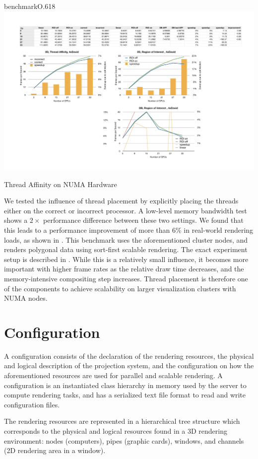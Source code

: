 \begin{wrapfloat}{benchmark}{O}{.618\textwidth}
 \includegraphics[width=.618\textwidth]{results/affinity.pdf}
 {\caption{\label{rNuma}Thread Affinity on NUMA Hardware}}
\end{wrapfloat}

We tested the influence of thread placement by explicitly placing the threads
either on the correct or incorrect processor. A low-level memory bandwidth test
shows a $2\times$ performance difference between these two settings. We found
that this leads to a performance improvement of more than 6\% in real-world
rendering loads, as shown in . This benchmark uses the
aforementioned cluster nodes, and renders polygonal data using sort-first
scalable rendering. The exact experiment setup is described in
\cite{EBAHMP:12}. While this is a relatively small influence, it becomes more
important with higher frame rates as the relative draw time decreases, and the
memory-intensive compositing step increases. Thread placement is therefore one
of the components to achieve scalability on larger visualization clusters with
NUMA nodes.


\section{Configuration}

A configuration consists of the declaration of the rendering resources, the
physical and logical description of the projection system, and the
configuration on how the aforementioned resources are used for parallel and
scalable rendering. A configuration is an instantiated class hierarchy in
memory used by the server to compute rendering tasks, and has a serialized text
file format to read and write configuration files.

The rendering resources are represented in a hierarchical tree structure
which corresponds to the physical and logical resources found in a 3D
rendering environment: nodes (computers), pipes (graphic cards),
windows, and channels (2D rendering area in a window).

